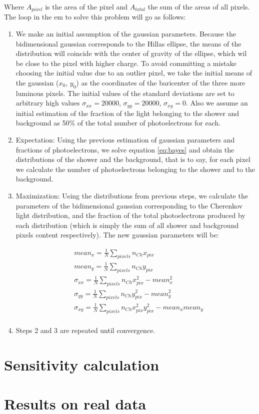 \documentclass[main.tex]{subfiles}
\begin{document}
Where $A_{pixel}$ is the area of the pixel and $A_{total}$ the sum of the areas of all pixels.\\
The loop in the \gls{em} to solve this problem will go as follows:
\begin{enumerate}
  \item We make an initial assumption of the gaussian parameters. Because the bidimensional gaussian corresponds to the Hillas ellipse, the means of the distribution will coincide with the center of gravity of the ellipse, which wil be close to the pixel with higher charge. To avoid committing a mistake choosing the initial value due to an outlier pixel, we take the initial means of the gaussian ($x_0$, $y_0$) as the coordinates of the baricenter of the three more luminous pixels. The initial values of the standard deviations are set to arbitrary high values $\sigma_{xx}=20000$, $\sigma_{yy}=20000$, $\sigma_{xy}=0$. Also we assume an initial estimation of the fraction of the light belonging to the shower and background as 50\% of the total number of photoelectrons for each.

  \item Expectation: Using the previous estimation of gaussian parameters and fractions of photoelectrons, we solve equation \ref{eq:bayes} and obtain the distributions of the shower and the background, that is to say, for each pixel we calculate the number of photoelectrons belonging to the shower and to the background.

  \item Maximization: Using the distributions from previous steps, we calculate the parameters of the bidimensional gaussian corresponding to the Cherenkov light distribution, and the fraction of the total photoelectrons produced by each distribution (which is simply the sum of all shower and background pixels content respectively). The new gaussian parameters will be:

    \begin{equation}
      \begin{split}
        & mean_{x} = \frac{1}{N}\sum_{pixels} n_{Ch} x_{pix}\\
        & mean_{y} = \frac{1}{N}\sum_{pixels} n_{Ch} y_{pix}\\
        & \sigma_{xx} = \frac{1}{N}\sum_{pixels} n_{Ch} x_{pix}^{2} - mean_{x}^2\\
        & \sigma_{yy} = \frac{1}{N}\sum_{pixels} n_{Ch} y_{pix}^{2} - mean_{y}^2\\
        & \sigma_{xy} = \frac{1}{N}\sum_{pixels} n_{Ch} x_{pix}^{2} y_{pix}^{2} - mean_{x}mean_{y}\\
      \end{split}
    \end{equation}
  
  \item Steps 2 and 3 are repeated until convergence.


\end{enumerate}



\section{Sensitivity calculation}
\section{Results on real data}
\end{document}
